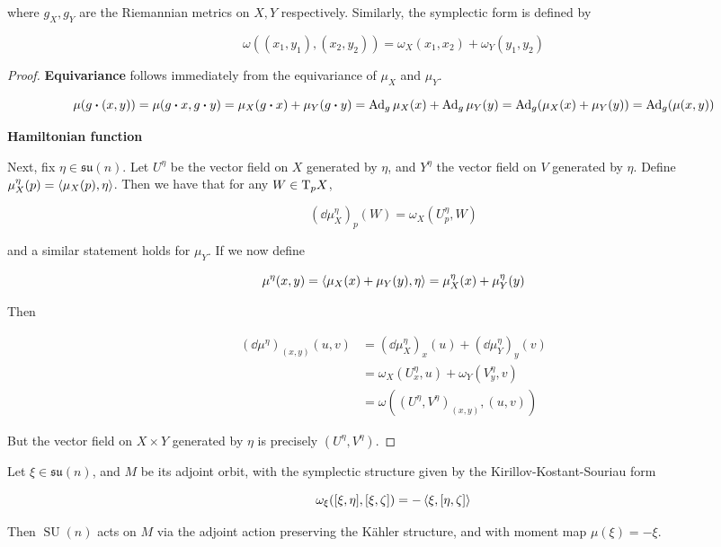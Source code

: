 \documentclass{article}
\DeclareMathOperator{\SU}{SU}
\newcommand{\su}{\mathfrak{su}}
\begin{document}
where \(g_X, g_Y\) are the Riemannian metrics on \(X, Y\) respectively. Similarly, the symplectic form is defined by

\[\omega((x_1, y_1), (x_2, y_2)) = \omega_X(x_1, x_2) + \omega_Y(y_1, y_2)\]

\begin{proof}
    \textbf{Equivariance} follows immediately from the equivariance of \(\mu_X\) and \(\mu_Y\).

    \[\mu(g\vdot (x, y)) = \mu(g \vdot x, g \vdot y) = \mu_X(g \vdot x) + \mu_Y(g \vdot y) = \Ad_g\mu_X(x) + \Ad_g\mu_Y(y) = \Ad_g(\mu_X(x) + \mu_Y(y)) = \Ad_g(\mu(x,y))\]

    \textbf{Hamiltonian function}

    Next, fix \(\eta \in \su(n)\). Let \(U^\eta\) be the vector field on \(X\) generated by \(\eta\), and \(Y^\eta\) the vector field on \(V\) generated by \(\eta\). Define \(\mu_X^\eta(p) = \left\langle \mu_X(p), \eta \right\rangle\). Then we have that for any \(W \in \mathrm{T}_pX\),

    \[(\dd\mu_X^\eta)_p(W) = \omega_X(U^\eta_p, W)\]

    and a similar statement holds for \(\mu_Y\). If we now define

    \[\mu^\eta(x, y) = \left\langle \mu_X(x) + \mu_Y(y), \eta \right\rangle = \mu_X^\eta(x) + \mu_Y^\eta(y)\]

    Then

    \begin{align*}
        (\dd\mu^\eta)_{(x, y)}(u, v) &= (\dd\mu_X^\eta)_x(u) + (\dd\mu_Y^\eta)_y(v)\\
        &= \omega_X(U_x^\eta, u) + \omega_Y(V_y^\eta, v) \\
        &= \omega((U^\eta, V^\eta)_{(x, y)}, (u, v))
    \end{align*}

    But the vector field on \(X \times Y\) generated by \(\eta\) is precisely \((U^\eta, V^\eta)\).
\end{proof}

\begin{lemma}
    Let \(\xi \in \su(n)\), and \(M\) be its adjoint orbit, with the symplectic structure given by the Kirillov-Kostant-Souriau form

    \[\omega_\xi([\xi, \eta], [\xi, \zeta]) = -\left\langle \xi, [\eta, \zeta] \right\rangle\]

    Then \(\SU(n)\) acts on \(M\) via the adjoint action preserving the K\"ahler structure, and with moment map \(\mu(\xi) = -\xi\).
\end{lemma}
\end{document}
